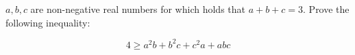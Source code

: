 
$a, b, c$ are non-negative real numbers for which holds that  $a + b + c = 3$. Prove the following inequality:

\[
4 \geq a^2b + b^2c + c^2a + abc
\]
